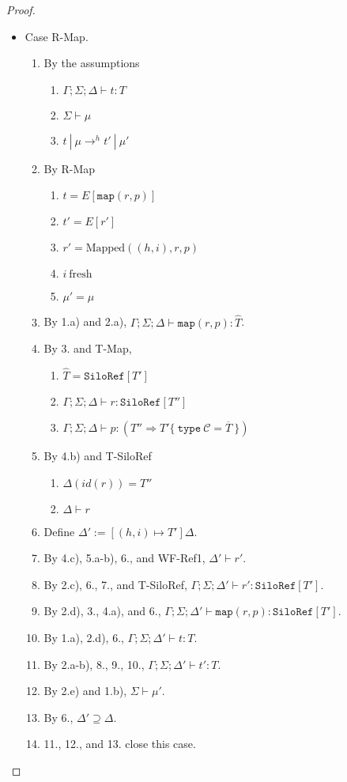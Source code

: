 \documentclass{article}
\theoremstyle{definition}
\newcommand{\seq}[1]{\overline{#1}}
\begin{document}
\begin{proof}
\begin{itemize}
\item Case R-Map.
\begin{enumerate}
\item By the assumptions
  \begin{enumerate}[label=(\alph*)]
  \item $\Gamma ; \Sigma ; \Delta \vdash t : T$
  \item $\Sigma \vdash \mu$
  \item $t~|~\mu \rightarrow^h t'~|~\mu'$
  \end{enumerate}
\item By R-Map
  \begin{enumerate}[label=(\alph*)]
  \item $t = E[\texttt{map}(r, p)]$
  \item $t' = E[r']$
  \item $r' = \text{Mapped}((h, i), r, p)$
  \item $i~\text{fresh}$
  \item $\mu' = \mu$
  \end{enumerate}
\item By 1.a) and 2.a), $\Gamma ; \Sigma ; \Delta \vdash \texttt{map}(r, p) : \hat{T}$.
\item By 3. and T-Map,
  \begin{enumerate}[label=(\alph*)]
  \item $\hat{T} = \texttt{SiloRef}[T']$
  \item $\Gamma ; \Sigma ; \Delta \vdash r : \texttt{SiloRef}[T'']$
  \item $\Gamma ; \Sigma ; \Delta \vdash p : (T'' \Rightarrow T' \{~\texttt{type}~\mathcal{C} = \seq{T}~\})$
  \end{enumerate}
\item By 4.b) and T-SiloRef
  \begin{enumerate}[label=(\alph*)]
  \item $\Delta(id(r)) = T''$
  \item $\Delta \vdash r$
  \end{enumerate}
\item Define $\Delta' := [(h, i) \mapsto T']\Delta$.
\item By 4.c), 5.a-b), 6., and WF-Ref1, $\Delta' \vdash r'$.
\item By 2.c), 6., 7., and T-SiloRef, $\Gamma ; \Sigma ; \Delta' \vdash r' : \texttt{SiloRef}[T']$.
\item By 2.d), 3., 4.a), and 6., $\Gamma ; \Sigma ; \Delta' \vdash \texttt{map}(r, p) : \texttt{SiloRef}[T']$.
\item By 1.a), 2.d), 6., $\Gamma ; \Sigma ; \Delta' \vdash t : T$.
\item By 2.a-b), 8., 9., 10., $\Gamma ; \Sigma ; \Delta' \vdash t' : T$.
\item By 2.e) and 1.b), $\Sigma \vdash \mu'$.
\item By 6., $\Delta' \supseteq \Delta$.
\item 11., 12., and 13. close this case.
\end{enumerate}


\end{itemize}
\end{proof}
\end{document}
